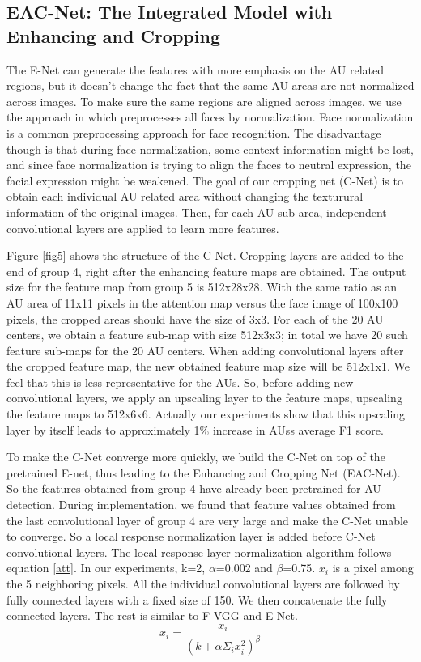 \documentclass[a4paper, 10pt, conference]{ieeeconf}      %
\begin{document}
\subsection{EAC-Net: The Integrated Model with Enhancing and Cropping}
The E-Net can generate the features with more emphasis on the AU related regions, but it doesn't change the fact that the same AU areas are not normalized across images. To make sure the same regions are aligned across images, we use the approach in \cite{p22} which preprocesses all faces by normalization. Face normalization is a common preprocessing approach for face recognition. The disadvantage though is that during face normalization, some context information might be lost, and since face normalization is trying to align the faces to neutral expression, the facial expression might be weakened. The goal of our cropping net (C-Net) is to obtain each individual AU related area without changing the texturural information of the original images. Then, for each AU sub-area, independent convolutional layers are applied to learn more features.

Figure \ref{fig5} shows the structure of the C-Net. Cropping layers are added to the end of group 4, right after the enhancing feature maps are obtained. The output size for the feature map from group 5 is 512x28x28. With the same ratio as an AU area of 11x11 pixels in the attention map versus the face image of 100x100 pixels, the cropped areas should have the size of 3x3. For each of the 20 AU centers, we obtain a feature sub-map with size 512x3x3; in total we have 20 such feature sub-maps for the 20 AU centers. When adding convolutional layers after the cropped feature map, the new obtained feature map size will be 512x1x1. We feel that this is less representative for the AUs. So, before adding new convolutional layers, we apply an upscaling layer to the feature maps, upscaling the feature maps to 512x6x6. Actually our experiments show that this upscaling layer by itself leads to approximately 1\% increase in AUss average F1 score.

To make the C-Net converge more quickly, we build the C-Net on top of the pretrained E-net, thus leading to the Enhancing and Cropping Net (EAC-Net). So the features obtained from group 4 have already been pretrained for AU detection. During implementation, we found that feature values obtained from the last convolutional layer of group 4 are very large and make the C-Net unable to converge. So a local response normalization layer is added before C-Net convolutional layers. The local response layer normalization algorithm follows equation \ref{att}. In our experiments, k=2, $\alpha$=0.002 and $\beta$=0.75. $x_{i}$ is a pixel among the 5 neighboring pixels.
All the individual convolutional layers are followed by fully connected layers with a fixed size of 150. We then concatenate the fully connected layers. The rest is similar to F-VGG and E-Net.
\begin{equation}
\label{att}
x_{i}=\frac{x_{i}}{(k+\alpha \Sigma _{i}x_{i}^{2})^{\beta} }
\end{equation}
\end{document}
